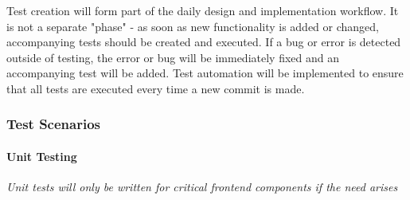 \documentclass{article}
\begin{document}
		Test creation will form part of the daily design and implementation workflow. It is not a separate "phase" - as soon as new functionality is added or changed, accompanying tests should be created and executed. If a bug or error is detected outside of testing, the error or bug will be immediately fixed and an accompanying test will be added. Test automation will be implemented to ensure that all tests are executed every time a new commit is made. 
			
		\subsubsection{Test Scenarios}
			\paragraph{Unit Testing}
				\textit{Unit tests will only be written for critical frontend components if the need arises}
\end{document}
